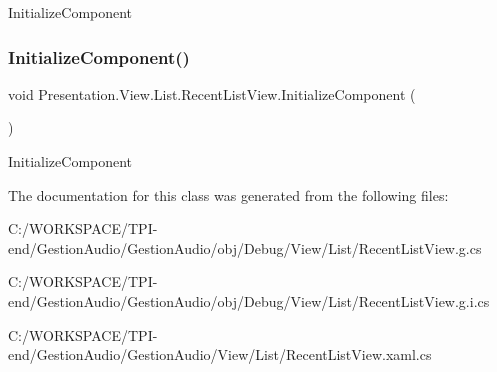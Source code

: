 Initialize\+Component 

\mbox{\label{class_presentation_1_1_view_1_1_list_1_1_recent_list_view_a9b8ba95e34c16c869bd75522ceacb7dc}} 
\subsubsection{\texorpdfstring{Initialize\+Component()}{InitializeComponent()}\hspace{0.1cm}{\footnotesize\ttfamily [4/4]}}
{\footnotesize\ttfamily void Presentation.\+View.\+List.\+Recent\+List\+View.\+Initialize\+Component (\begin{DoxyParamCaption}{ }\end{DoxyParamCaption})}



Initialize\+Component 



The documentation for this class was generated from the following files\+:\begin{DoxyCompactItemize}
\item 
C\+:/\+W\+O\+R\+K\+S\+P\+A\+C\+E/\+T\+P\+I-\/end/\+Gestion\+Audio/\+Gestion\+Audio/obj/\+Debug/\+View/\+List/Recent\+List\+View.\+g.\+cs\item 
C\+:/\+W\+O\+R\+K\+S\+P\+A\+C\+E/\+T\+P\+I-\/end/\+Gestion\+Audio/\+Gestion\+Audio/obj/\+Debug/\+View/\+List/Recent\+List\+View.\+g.\+i.\+cs\item 
C\+:/\+W\+O\+R\+K\+S\+P\+A\+C\+E/\+T\+P\+I-\/end/\+Gestion\+Audio/\+Gestion\+Audio/\+View/\+List/Recent\+List\+View.\+xaml.\+cs\end{DoxyCompactItemize}
